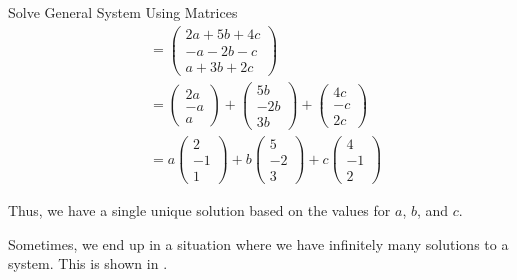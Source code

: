\begin{example}{Solve General System Using Matrices}
\begin{align*}
    &=
      \begin{pmatrix}
        2a + 5b + 4c \\
        -a - 2b - c \\
        a + 3b + 2c
      \end{pmatrix} \\
        &=
          \begin{pmatrix}
            2a \\
            -a \\
            a
          \end{pmatrix} +
    \begin{pmatrix}
      5b \\
      -2b \\
      3b
    \end{pmatrix} +
    \begin{pmatrix}
      4c \\
      -c \\
      2c
    \end{pmatrix} \\
    &= a
      \begin{pmatrix}
        2 \\
        -1 \\
        1
      \end{pmatrix}
    + b
    \begin{pmatrix}
      5 \\
      -2 \\
      3
    \end{pmatrix}
    + c
    \begin{pmatrix}
      4 \\
      -1 \\
      2
    \end{pmatrix}
  \end{align*}

  Thus, we have a single unique solution based on the values for $a$, $b$, and $c$.
\end{example}

Sometimes, we end up in a situation where we have infinitely many solutions to a system.
This is shown in .

